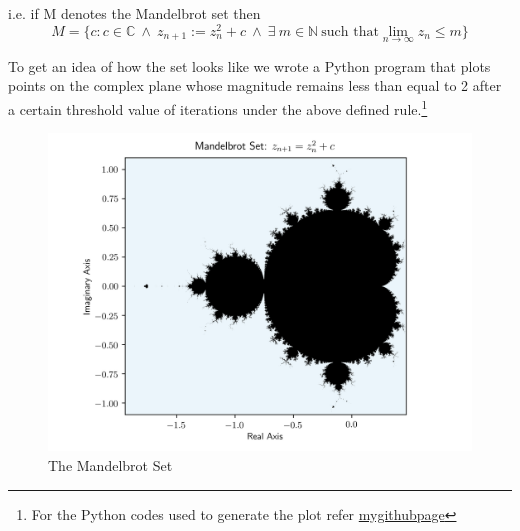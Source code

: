 \documentclass[14pts]{article}
\begin{document}
    i.e. if M denotes the Mandelbrot set then
    \[ M = \{c : c \in \mathbb{C} \ \land \ z_{n+1}:=z_{n}^2 + c \ \land \ \exists \ m \in \mathbb{N} \ \text{such that} \lim_{n \to \infty} z_{n} \leq m \} \]

    To get an idea of how the set looks like we wrote a Python program that plots points on the complex plane whose magnitude remains less than equal to 2 after a certain threshold value of iterations under the above defined rule.\footnote[2]{For the Python codes used to generate the plot refer \url{mygithubpage}}
    \bigskip

    
    \begin{figure}[!h]
        \centering
        \includegraphics[width = \textwidth]{Images/Mandelbrot_set.png}
        \caption{The Mandelbrot Set}
        \label{fig:Mandelbrot}
    \end{figure}
\end{document}
